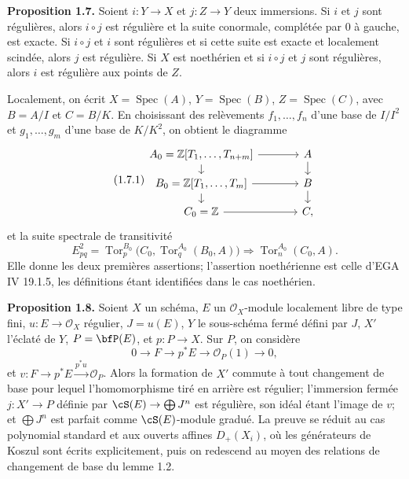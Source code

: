 \documentclass[11pt]{article}
\newcommand{\Tor}{\operatorname{Tor}}
\newcommand{\Spec}{\operatorname{Spec}}
\providecommand{\Tor}{\operatorname{Tor}}
\providecommand{\cO}{\mathcal O}
\begin{document}
\textbf{Proposition 1.7.} Soient \(i:Y\to X\) et \(j:Z\to Y\) deux immersions. Si \(i\) et \(j\) sont régulières, alors \(i\circ j\) est régulière et la suite conormale, complétée par \(0\) à gauche, est exacte. Si \(i\circ j\) et \(i\) sont régulières et si cette suite est exacte et localement scindée, alors \(j\) est régulière. Si \(X\) est noethérien et si \(i\circ j\) et \(j\) sont régulières, alors \(i\) est régulière aux points de \(Z\).

Localement, on écrit \(X=\Spec(A)\), \(Y=\Spec(B)\), \(Z=\Spec(C)\), avec \(B=A/I\) et \(C=B/K\). En choisissant des relèvements \(f_1,\ldots,f_n\) d'une base de \(I/I^2\) et \(g_1,\ldots,g_m\) d'une base de \(K/K^2\), on obtient le diagramme
\begin{equation}\tag{1.7.1}
\begin{tikzcd}[column sep=large,row sep=small]
A_0=\mathbb Z[T_1,\ldots,T_{n+m}] \arrow[r] \arrow[d] & A \arrow[d]\\
B_0=\mathbb Z[T_1,\ldots,T_m] \arrow[r] \arrow[d] & B \arrow[d]\\
C_0=\mathbb Z \arrow[r] & C,
\end{tikzcd}
\end{equation}
et la suite spectrale de transitivité
\begin{equation}\tag{1.7.3}
E^2_{pq}=\Tor_p^{B_0}\bigl(C_0,\Tor_q^{A_0}(B_0,A)\bigr)\Rightarrow\Tor_n^{A_0}(C_0,A).
\end{equation}
Elle donne les deux premières assertions; l'assertion noethérienne est celle d'EGA IV 19.1.5, les définitions étant identifiées dans le cas noethérien.

\textbf{Proposition 1.8.} Soient \(X\) un schéma, \(E\) un \(\cO_X\)-module localement libre de type fini, \(u:E\to\cO_X\) régulier, \(J=u(E)\), \(Y\) le sous-schéma fermé défini par \(J\), \(X'\) l'éclaté de \(Y\), \(P=\bfP(E)\), et \(p:P\to X\). Sur \(P\), on considère
\begin{equation}\tag{1.8.1}
0\to F\to p^*E\to\cO_P(1)\to0,
\end{equation}
et \(v:F\to p^*E\xrightarrow{p^*u}\cO_P\). Alors la formation de \(X'\) commute à tout changement de base pour lequel l'homomorphisme tiré en arrière est régulier; l'immersion fermée \(j:X'\to P\) définie par \(\cS(E)\to\bigoplus J^n\) est régulière, son idéal étant l'image de \(v\); et \(\bigoplus J^n\) est parfait comme \(\cS(E)\)-module gradué. La preuve se réduit au cas polynomial standard et aux ouverts affines \(D_+(X_i)\), où les générateurs de Koszul sont écrits explicitement, puis on redescend au moyen des relations de changement de base du lemme 1.2.
\end{document}
